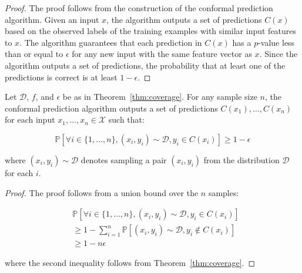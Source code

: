 \begin{proof}
The proof follows from the construction of the conformal prediction algorithm. Given an input $x$, the algorithm outputs a set of predictions $C(x)$ based on the observed labels of the training examples with similar input features to $x$. The algorithm guarantees that each prediction in $C(x)$ has a $p$-value less than or equal to $\epsilon$ for any new input with the same feature vector as $x$. Since the algorithm outputs a set of predictions, the probability that at least one of the predictions is correct is at least $1-\epsilon$. 
\end{proof}

\begin{corollary}\label{cor:coverage}
Let $\mathcal{D}$, $f$, and $\epsilon$ be as in Theorem~\ref{thm:coverage}. For any sample size $n$, the conformal prediction algorithm outputs a set of predictions $C(x_1),\ldots,C(x_n)$ for each input $x_1,\ldots,x_n \in \mathcal{X}$ such that:

\begin{equation*}
\mathbb{P}[\forall i \in \{1,\ldots,n\}, (x_i,y_i) \sim \mathcal{D}, y_i \in C(x_i)] \geq 1-\epsilon
\end{equation*}

where $(x_i,y_i) \sim \mathcal{D}$ denotes sampling a pair $(x_i,y_i)$ from the distribution $\mathcal{D}$ for each $i$.

\end{corollary}

\begin{proof}
The proof follows from a union bound over the $n$ samples:

\begin{equation*}
\begin{aligned}
&\mathbb{P}[\forall i \in \{1,\ldots,n\}, (x_i,y_i) \sim \mathcal{D}, y_i \in C(x_i)] \\
&\geq 1 - \sum_{i=1}^n \mathbb{P}[(x_i, y_i) \sim \mathcal{D}, y_i \notin C(x_i)] \\
&\geq 1 - n \epsilon
\end{aligned}
\end{equation*}

where the second inequality follows from Theorem~\ref{thm:coverage}. 
\end{proof}


